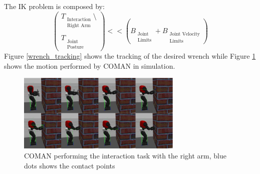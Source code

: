 The IK problem is composed by:
\begin{equation}
\begin{pmatrix}
T_{\substack{\text{Interaction}\\\text{Right Arm}}}\setminus\\
\\
T_{\substack{\text{Joint}\\\text{Posture}}}
\end{pmatrix}
<< \left(B_{\substack{\text{Joint}\\\text{Limits}}} + B_{\substack{\text{Joint Velocity}\\\text{Limits}}}\right)
\end{equation}
Figure \ref{wrench_tracking} shows the tracking of the desired wrench while Figure \ref{interaction_COMAN} shows the motion performed by COMAN in simulation.
\begin{figure}[!h]
\vspace{2 mm}
\centering
\includegraphics[width=0.7\textwidth]{images/interaction/interaction.eps}
\caption{COMAN performing the interaction task with the right arm, blue dots shows the contact points}
\label{interaction_COMAN}
\end{figure}

